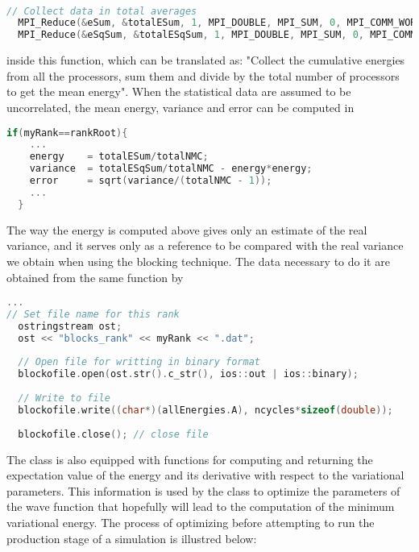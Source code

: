 \\
\begin{lstlisting}[language=c++]
  // Collect data in total averages
  MPI_Reduce(&eSum, &totalESum, 1, MPI_DOUBLE, MPI_SUM, 0, MPI_COMM_WORLD);
  MPI_Reduce(&eSqSum, &totalESqSum, 1, MPI_DOUBLE, MPI_SUM, 0, MPI_COMM_WORLD);
\end{lstlisting}
inside this function, which can be translated as: "Collect the cumulative energies from all the processors, sum them and divide by the total number of processors to get the mean energy". When the statistical data are assumed to be uncorrelated, the mean energy, variance and error can be computed in
\\
\begin{lstlisting}[language=c++]
  if(myRank==rankRoot){
    ...
    energy    = totalESum/totalNMC;
    variance  = totalESqSum/totalNMC - energy*energy;
    error     = sqrt(variance/(totalNMC - 1)); 
    ...
  }
\end{lstlisting}

The way the energy is computed above gives only an estimate of the real variance, and it serves only as a reference to be compared with the real variance we obtain when using the blocking technique. The data necessary to do it are obtained from the same function by
\\
\begin{lstlisting}[language=c++]
...
// Set file name for this rank
  ostringstream ost;
  ost << "blocks_rank" << myRank << ".dat";
  
  // Open file for writting in binary format
  blockofile.open(ost.str().c_str(), ios::out | ios::binary); 
  
  // Write to file
  blockofile.write((char*)(allEnergies.A), ncycles*sizeof(double));
  
  blockofile.close(); // close file
\end{lstlisting}
\noindent
The  class is also equipped with functions for computing and returning the expectation value of the energy and its derivative with respect to the variational parameters. This information is used by the class  to optimize the parameters of the wave function that hopefully will lead to the computation of the minimum variational energy. The process of optimizing before attempting to run the production stage of a simulation is illustred below:

